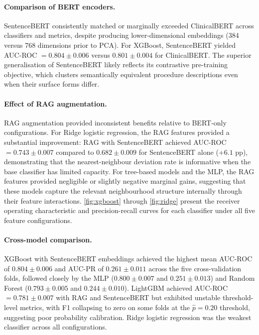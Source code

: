 \paragraph{Comparison of BERT encoders.}
SentenceBERT consistently matched or marginally exceeded ClinicalBERT across
classifiers and metrics, despite producing lower-dimensional embeddings (384
versus 768 dimensions prior to PCA).  For XGBoost, SentenceBERT yielded
AUC-ROC $= 0.804 \pm 0.006$ versus $0.801 \pm 0.004$ for ClinicalBERT.  The
superior generalisation of SentenceBERT likely reflects its contrastive
pre-training objective, which clusters semantically equivalent procedure
descriptions even when their surface forms differ.

\paragraph{Effect of RAG augmentation.}
RAG augmentation provided inconsistent benefits relative to BERT-only
configurations.  For Ridge logistic regression, the RAG features provided a
substantial improvement: RAG with SentenceBERT achieved AUC-ROC $= 0.743
\pm 0.007$ compared to $0.682 \pm 0.009$ for SentenceBERT alone ($+6.1$ pp),
demonstrating that the nearest-neighbour deviation rate is informative when
the base classifier has limited capacity.  For tree-based
models and the MLP, the RAG features provided negligible or slightly negative
marginal gains, suggesting that these models capture the relevant neighbourhood
structure internally through their feature interactions.  \cref{fig:xgboost}
through \cref{fig:ridge} present the receiver operating characteristic and
precision-recall curves for each classifier under all five feature
configurations.

\paragraph{Cross-model comparison.}
XGBoost with SentenceBERT embeddings achieved the highest mean AUC-ROC of
$0.804 \pm 0.006$ and AUC-PR of $0.261 \pm 0.011$ across the five
cross-validation folds, followed closely by the MLP ($0.800 \pm 0.007$ and
$0.251 \pm 0.013$) and Random Forest ($0.793 \pm 0.005$ and $0.244 \pm
0.010$).  LightGBM achieved AUC-ROC $= 0.781 \pm 0.007$ with RAG and SentenceBERT
but exhibited unstable threshold-level metrics,
with F1 collapsing to zero on some folds at the $\hat{p} = 0.20$ threshold,
suggesting poor probability calibration.  Ridge logistic regression was the
weakest classifier across all configurations.

